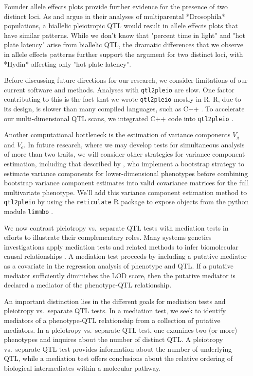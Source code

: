 \documentclass[12pt,twoside, lineno]{gsajnl}
\begin{document}
Founder allele effects plots provide further evidence for the presence
of two distinct loci. As \citet{macdonald2007joint} and
\citet{king2012genetic} argue in their analyses of multiparental
*Drosophila* populations, a biallelic pleiotropic QTL would result in
allele effects plots that have similar patterns. While we don't know
that "percent time in light" and "hot plate latency" arise from
biallelic QTL, the dramatic differences that we observe in allele
effects patterns further support the argument for two distinct loci,
with *Hydin* affecting only "hot plate latency".

Before discussing future directions for our research, we consider
limitations of our current software and methods. Analyses with
\texttt{qtl2pleio} are slow. One factor contributing to this is the
fact that we wrote \texttt{qtl2pleio} mostly in R. R, due to its
design, is slower than many compiled languages, such as C++
\citep{wickham2014advanced}. To accelerate our multi-dimensional QTL
scans, we integrated C++ code into \texttt{qtl2pleio}
\citep{eddelbuettel2011rcpp}.

Another computational bottleneck is the estimation of variance
components $V_g$ and $V_e$. In future research, where we may develop
tests for simultaneous analysis of more than two traits, we will
consider other strategies for variance component estimation, including
that described by \citet{hannah2018limmbo}, who implement a bootstrap
strategy to estimate variance components for lower-dimensional
phenotypes before combining bootstrap variance component estimates
into valid covariance matrices for the full multivariate phenotype.
We'll add this variance component estimation method to
\texttt{qtl2pleio} by using the \texttt{reticulate} R package to
expose objects from the python module \texttt{limmbo}
\citep{reticulate}.


We now contrast pleiotropy vs.\ separate QTL tests with mediation tests
in efforts to illustrate their complementary roles. Many systems
genetics investigations apply mediation tests and related methods to
infer biomolecular causal relationships
\citep{chick2016defining,schadt2005integrative,baron1986moderator}. A
mediation test proceeds by including a putative mediator as a
covariate in the regression analysis of phenotype and QTL. If a
putative mediator sufficiently diminishes the LOD score, then the
putative mediator is declared a mediator of the phenotype-QTL
relationship.

An important distinction lies in the different goals for mediation
tests and pleiotropy vs.\ separate QTL tests. In a mediation test, we
seek to identify mediators of a phenotype-QTL relationship from a
collection of putative mediators. In a pleiotropy vs.\ separate QTL
test, one examines two (or more) phenotypes and inquires about the
number of distinct QTL. A pleiotropy vs.\ separate QTL test provides
information about the number of underlying QTL, while a mediation test
offers conclusions about the relative ordering of biological
intermediates within a molecular pathway.
\end{document}
